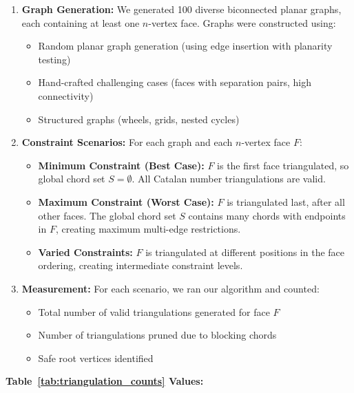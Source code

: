\documentclass[12pt,a4paper]{article}
\theoremstyle{definition}
\theoremstyle{remark}
\begin{document}
\begin{enumerate}
    \item \textbf{Graph Generation:} We generated 100 diverse biconnected planar graphs, each containing at least one $n$-vertex face. Graphs were constructed using:
    \begin{itemize}
        \item Random planar graph generation (using edge insertion with planarity testing)
        \item Hand-crafted challenging cases (faces with separation pairs, high connectivity)
        \item Structured graphs (wheels, grids, nested cycles)
    \end{itemize}
    
    \item \textbf{Constraint Scenarios:} For each graph and each $n$-vertex face $F$:
    \begin{itemize}
        \item \textbf{Minimum Constraint (Best Case):} $F$ is the first face triangulated, so global chord set $S = \emptyset$. All Catalan number triangulations are valid.
        \item \textbf{Maximum Constraint (Worst Case):} $F$ is triangulated last, after all other faces. The global chord set $S$ contains many chords with endpoints in $F$, creating maximum multi-edge restrictions.
        \item \textbf{Varied Constraints:} $F$ is triangulated at different positions in the face ordering, creating intermediate constraint levels.
    \end{itemize}
    
    \item \textbf{Measurement:} For each scenario, we ran our algorithm and counted:
    \begin{itemize}
        \item Total number of valid triangulations generated for face $F$
        \item Number of triangulations pruned due to blocking chords
        \item Safe root vertices identified
    \end{itemize}
\end{enumerate}

\textbf{Table~\ref{tab:triangulation_counts} Values:}
\end{document}
